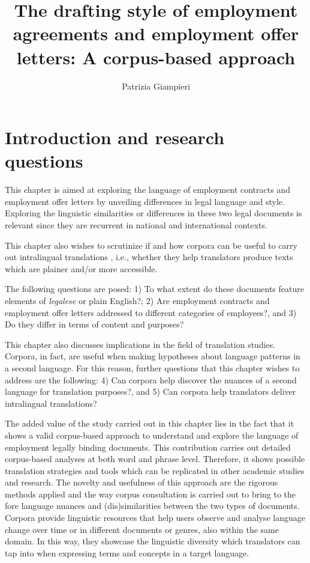 \documentclass[output=paper]{langscibook}
\author{Patrizia Giampieri\orcid{}\affiliation{Università degli Studi di Perugia}}
\title[The drafting style of employment agreements and employment offer letters]{The drafting style of employment agreements and employment offer letters: A corpus-based approach}
\begin{document}
\maketitle



\section{Introduction and research questions}\label{sec:giampieri:1}

This chapter is aimed at exploring the language of employment contracts and employment offer letters by unveiling differences in legal language and style. Exploring the linguistic similarities or differences in these two legal documents is relevant since they are recurrent in national and international contexts.

This chapter also wishes to scrutinize if and how corpora can be useful to carry out intralingual translations \citep{Jakobson1959}, i.e., whether they help translators produce texts which are plainer and/or more accessible.

The following questions are posed: 1) To what extent do these documents feature elements of \textit{legalese} or plain English?; 2) Are employment contracts and employment offer letters addressed to different categories of employees?, and 3) Do they differ in terms of content and purposes?

This chapter also discusses implications in the field of translation studies. Corpora, in fact, are useful when making hypotheses about language patterns in a second language. For this reason, further questions that this chapter wishes to address are the following: 4) Can corpora help discover the nuances of a second language for translation purposes?, and 5) Can corpora help translators deliver intralingual translations?

The added value of the study carried out in this chapter lies in the fact that it shows a valid corpus-based approach to understand and explore the language of employment legally binding documents. This contribution carries out detailed corpus-based analyses at both word and phrase level. Therefore, it shows possible translation strategies and tools which can be replicated in other academic studies and research. The novelty and usefulness of this approach are the rigorous methods applied and the way corpus consultation is carried out to bring to the fore language nuances and (dis)similarities between the two types of documents. Corpora provide linguistic resources that help users observe and analyse language change over time or in different documents or genres, also within the same domain. In this way, they showcase the linguistic diversity which translators can tap into when expressing terms and concepts in a target language.
\end{document}
